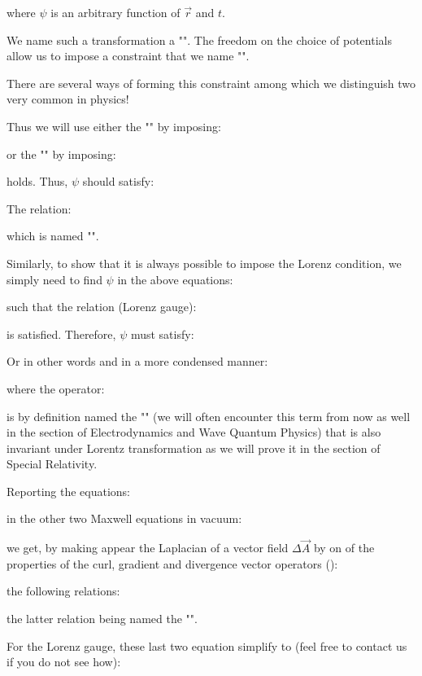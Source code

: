 	where $\psi$ is an arbitrary function of $\vec{r}$ and $t$.
	
	We name such a transformation a "". The freedom on the choice of potentials allow us to impose a constraint that we name "".
	
	There are several ways of forming this constraint among which we distinguish two very common in physics!

	Thus we will use either the "" by imposing:
	
	or the "" by imposing:
	
	holds. Thus, $\psi$ should satisfy:
	
	The relation:
	
	which is named "".
	
	Similarly, to show that it is always possible to impose the Lorenz condition, we simply need to find $\psi$ in the above equations:
	
	such that the relation (Lorenz gauge):
	
	is satisfied. Therefore, $\psi$ must satisfy:
	
	Or in other words and in a more condensed manner:
	
	where the operator:
	
	is by definition named the "\label{alembertian}" (we will often encounter this term from now as well in the section of Electrodynamics and Wave Quantum Physics) that is also invariant under Lorentz transformation as we will prove it in the section of Special Relativity.
	
	Reporting the equations:
	
	in the other two Maxwell equations in vacuum:
	
	we get, by making appear the Laplacian of a vector field $\Delta \vec{A}$ by on of the properties of the curl, gradient and divergence vector operators ():
	
	the following relations:
	
	the latter relation being named the "".
	
	For the Lorenz gauge, these last two equation simplify to (feel free to contact us if you do not see how):
	
